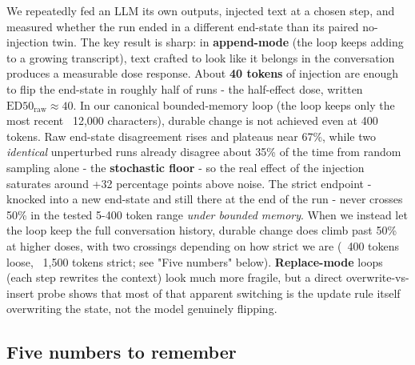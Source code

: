 \documentclass{article}
\theoremstyle{plain}
\theoremstyle{definition}
\begin{document}
We repeatedly fed an LLM its own outputs, injected text at a chosen
step, and measured whether the run ended in a different end-state
than its paired no-injection twin. The key result is sharp: in
\textbf{append-mode} (the loop keeps adding to a growing transcript),
text crafted to look like it belongs in the conversation produces
a measurable dose response. About \textbf{40 tokens} of injection are
enough to flip the end-state in roughly half of runs - the
half-effect dose, written $\mathrm{ED50}_{\mathrm{raw}} \approx 40$.
In our canonical bounded-memory loop (the loop keeps only the most
recent ~12,000 characters), durable change is not achieved even at
400 tokens. Raw end-state disagreement rises and plateaus near 67\%,
while two \textit{identical} unperturbed runs already disagree about 35\%
of the time from random sampling alone - the \textbf{stochastic floor} -
so the real effect of the injection saturates around +32 percentage
points above noise. The strict endpoint - knocked into a new
end-state and still there at the end of the run - never crosses
50\% in the tested 5-400 token range \textit{under bounded memory}. When
we instead let the loop keep the full conversation history, durable
change does climb past 50\% at higher doses, with two crossings
depending on how strict we are (~400 tokens loose, ~1,500 tokens
strict; see "Five numbers" below). \textbf{Replace-mode} loops (each step rewrites the
context) look much more fragile, but a direct overwrite-vs-insert
probe shows that most of that apparent switching is the update rule
itself overwriting the state, not the model genuinely flipping.

\subsection*{Five numbers to remember}
\end{document}
